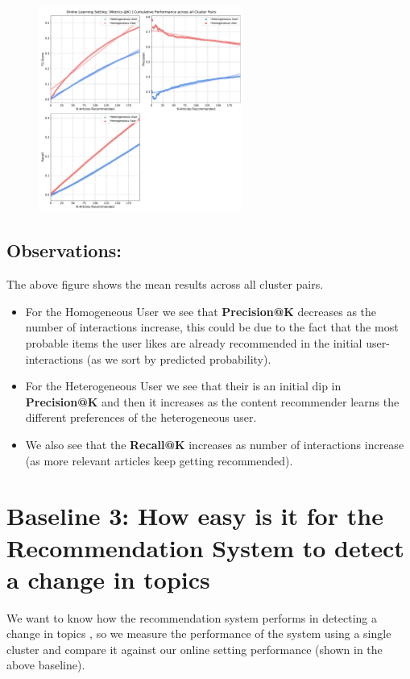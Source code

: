 \documentclass[a4paper,fontsize=9.0pt]{scrartcl}
\begin{document}
\vspace{-3ex}
\begin{figure}[H]
 \includegraphics[width=0.6\textwidth]{Graphs/user_interaction_vs_model_performance_cumu.pdf}
\end{figure}
\subsection{Observations:}
\begin{flushleft}
The above figure shows the mean results across all cluster pairs.
\begin{itemize}
    \item For the Homogeneous User we see that \textbf{Precision@K} decreases as the number of interactions increase, this could be due to the fact that the most probable items the user likes are already recommended in the initial user-interactions (as we sort by predicted probability).
    \item For the Heterogeneous User we see that their is an initial dip in \textbf{Precision@K} and then it increases as the content recommender learns the different preferences of the heterogeneous user.
    \item We also see that the \textbf{Recall@K} increases as number of interactions increase (as more relevant articles keep getting recommended).
\end{itemize}
\end{flushleft}


\vspace{-1ex}
\section{Baseline 3: How easy is it for the Recommendation System to detect a change in topics}
\begin{flushleft}
We want to know how the recommendation system performs in detecting a change in topics , so we measure the performance of the system using a single cluster and compare it against our online setting performance (shown in the above baseline). 
\end{flushleft}
\end{document}
